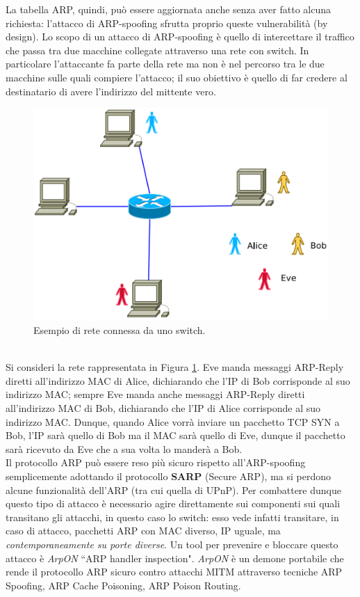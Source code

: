 La tabella ARP, quindi, può essere aggiornata anche senza aver fatto alcuna richiesta: l'attacco di ARP-spoofing sfrutta proprio queste vulnerabilità (by design). Lo scopo di un attacco di ARP-spoofing è quello di intercettare il traffico che passa tra due macchine collegate attraverso una rete con switch. In particolare l'attaccante fa parte della rete ma non è nel percorso tra le due macchine sulle quali compiere l'attacco; il suo obiettivo è quello di far credere al destinatario di avere l'indirizzo del mittente vero.
\begin{figure}[htbp]
	\centering
	\includegraphics[scale = 0.5]{images/ARP-spoofing}
	\caption{Esempio di rete connessa da uno switch.}
	\label{img:ARP-spoofing}
\end{figure}\\
Si consideri la rete rappresentata in Figura \ref{img:ARP-spoofing}. Eve manda messaggi ARP-Reply diretti all'indirizzo MAC di Alice, dichiarando che l'IP di Bob corrisponde al suo indirizzo MAC; sempre Eve manda anche messaggi ARP-Reply diretti all'indirizzo MAC di Bob, dichiarando che l'IP di Alice corrisponde al suo indirizzo MAC. Dunque, quando Alice vorrà inviare un pacchetto TCP SYN a Bob, l'IP sarà quello di Bob ma il MAC sarà quello di Eve, dunque il pacchetto sarà ricevuto da Eve che a sua volta lo manderà a Bob.\\
Il protocollo ARP può essere reso più sicuro rispetto all'ARP-spoofing semplicemente adottando il protocollo \textbf{SARP} (Secure ARP), ma si perdono alcune funzionalità dell'ARP (tra cui quella di UPnP). Per combattere dunque questo tipo di attacco è necessario agire direttamente sui componenti sui quali transitano gli attacchi, in questo caso lo switch: esso vede infatti transitare, in caso di attacco, pacchetti ARP con MAC diverso, IP uguale, ma \textit{contemporaneamente su porte diverse}. Un tool per prevenire e bloccare questo attacco è \textit{ArpON} \textquotedblleft ARP handler inspection". \textit{ArpON} è un demone portabile che rende il protocollo ARP sicuro contro attacchi MITM attraverso tecniche ARP Spoofing, ARP Cache Poisoning, ARP Poison Routing. 

